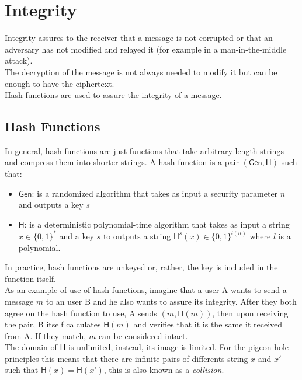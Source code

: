\section{Integrity}
Integrity assures to the receiver that a message is not corrupted or that an adversary has not modified and relayed it (for example in a man-in-the-middle attack).\\
The decryption of the message is not always needed to modify it but can be enough to have the ciphertext.\\
Hash functions are used to assure the integrity of a message.

\subsection{Hash Functions}
In general, hash functions are just functions that take arbitrary-length strings and compress them into shorter strings.
A hash function is a pair $(\mathsf{Gen}, \mathsf{H})$ such that:
\begin{itemize}
    \item{$\mathsf{Gen}$: is a randomized algorithm that takes as input a security parameter $n$ and outputs a key $s$}
    \item{$\mathsf{H}$: is a deterministic polynomial-time algorithm that takes as input a string $x \in \{0,1\}^*$ and a key $s$ to outputs a string $\mathsf{H}^s(x) \in \{0,1\}^{\mathit{l}(n)}$ where $\mathit{l}$ is a polynomial.}
\end{itemize}
In practice, hash functions are unkeyed or, rather, the key is included in the function itself.\\
As an example of use of hash functions, imagine that a user A wants to send a message $m$ to an user B and he also wants to assure its integrity. After they both agree on the hash function to use, A sends $(m, \mathsf{H}(m))$, then upon receiving the pair, B itself calculates $\mathsf{H}(m)$ and verifies that it is the same it received from A. If they match, $m$ can be considered intact.\\
The domain of $\mathsf{H}$ is unlimited, instead, its image is limited. For the pigeon-hole principles this means that there are infinite pairs of differents string $x$ and $x'$ such that $\mathsf{H}(x) = \mathsf{H}(x')$, this is also known as a \emph{collision}.

